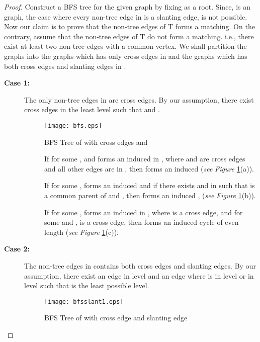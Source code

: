 \documentclass[runningheads]{llncs}
\begin{document}
\begin{proof}
Construct a BFS tree  for the given graph  by fixing  as a root. Since,  is an  graph, the case where every non-tree edge in  is a slanting edge, is not possible. Now our claim is to prove that the non-tree edges of T forms a matching. On the contrary, assume that the non-tree edges of T do not form a matching. i.e., there exist at least two non-tree edges with a common vertex. We shall partition the  graphs into the graphs which has only cross edges in  and the graphs which has both cross edges and slanting edges in .

\begin{description}
\item[\bf{Case 1:}] The only non-tree edges in  are cross edges. By our assumption,  there exist cross edges  in the least level  such that  and .

\begin{figure}[h]
\begin{center}
\texttt{[image: bfs.eps]}
\caption{BFS Tree  of  with cross edges  and }
\label{bfs1}
\end{center}
 \vspace{-0.7cm}
\end{figure}


\begin{description}
\item[] If for some ,  and  forms an induced  in , where  and  are cross edges and all other edges are in , then  forms an induced  (\emph{see} \emph{Figure }\ref{bfs1}(a)). 

\item[] If for some ,  forms an induced  and if there exists  and  in  such that  is a common parent of  and , then  forms an induced ,   (\emph{see} \emph{Figure }\ref{bfs1}(b)). 

\item[] If for some ,  forms an induced  in , where  is a cross edge, and for some  and ,  is a cross edge, then  forms an induced cycle of even length (\emph{see} \emph{Figure }\ref{bfs1}(c)).
\end{description}


\item[\bf{Case 2:}] The non-tree edges in  contains both cross edges and slanting edges. By our assumption, there exist an edge  in level  and an edge  where  is in level  or in level  such that  is the least possible level.

\begin{figure}[h]
\begin{center}
\texttt{[image: bfsslant1.eps]}
\caption{BFS Tree  of  with cross edge  and slanting edge }
\label{bfs2}
\end{center}
\end{figure}


\end{description}
\end{proof}
\end{document}

